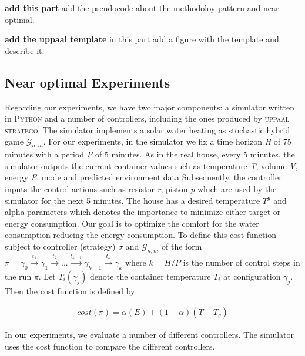     \textbf{add this part}
    add the pseudocode about the methodoloy pattern and near optimal.

    \textbf{add the uppaal template}
    in this part add a figure with the template and describe it.


    \clearpage

    \subsection{Near optimal Experiments}
    Regarding our experiments, we have two major components: a simulator 
    written in  \textsc{Python} and a number of controllers, including 
    the ones produced by \textsc{uppaal stratego}. The simulator implements
    a solar water heating as stochastic hybrid game $\mathcal{G}_{n,m}$. For our 
    experiments, in the simulator we fix a time horizon \emph{H} of 75 minutes
    with a period \emph{P} of 5 minutes. As in the real house, every 
    5 minutes, the simulator outputs the current container values such as
    temperature \emph{T}, volume \emph{V}, energy \emph{E}, mode and predicted 
    environment data Subsequently, the controller inputs the control actions 
    such as resistor \emph{r}, piston \emph{p} which are used by the simulator  
    for the next 5 minutes. The house has a desired temperature $T^g$ and alpha
    parameters which denotes the importance to minimize either target or 
    energy consumption. Our goal is to optimize the comfort for the water 
    consumption reducing the energy consumption. To define 
    this cost function subject to controller (strategy) $\sigma$ and 
    $\mathcal{G}_{n,m}$ of the form $\pi = \gamma_0 \xrightarrow{t_{1}} 
    \gamma_1 \xrightarrow{t_{2}} ... \xrightarrow{t_{k-1}} 
    \gamma_{k-1} \xrightarrow{t_{k}} \gamma_{k}$ where $k = H/P$ is the 
    number of control steps in the run $\pi$. Let $T_{i}(\gamma_j)$ denote
    the container temperature $T_i$ at configuration $\gamma_j$. Then the 
    cost function is defined by

    \begin{equation}
      \begin{aligned}
          cost(\pi) = \alpha(E) + (1-\alpha)(T-T_g)
      \end{aligned}
    \end{equation}

    In our experiments, we evaluate a number of different controllers. The 
    simulator uses the cost function to compare the different
    controllers.


